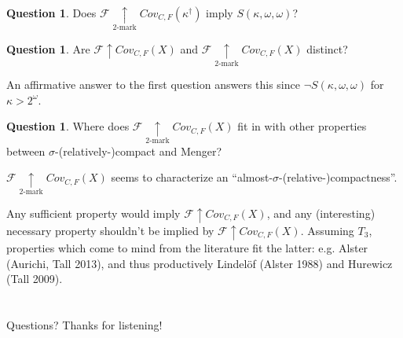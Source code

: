 \documentclass{beamer}
\theoremstyle{definition}
\newtheorem{question}[theorem]{Question}
\newcommand{\win}{\uparrow}
\newcommand{\kmarkwin}[1]{\underset{#1\text{-mark}}{\uparrow}}
\newcommand{\oneptlind}[1]{#1^\dagger}
\newcommand{\mengame}[1]{Cov_{C,F}(#1)}
\newcommand{\<}{\langle}
\renewcommand{\>}{\rangle}
\newcommand{\alcompS}[1]{S(#1,\omega,\omega)}
\newcommand{\pl}[1]{\mathscr{#1}}
\begin{document}
\begin{frame}
  \begin{question}
    Does $\pl F\kmarkwin2\mengame{\oneptlind\kappa}$ imply $\alcompS\kappa$?
  \end{question}

  \pause

  \begin{question}
    Are $\pl F\win\mengame X$ and $\pl F\kmarkwin2\mengame X$ distinct?
  \end{question}

  An affirmative answer to the first question answers this since
  $\neg\alcompS\kappa$ for $\kappa>2^\omega$.
\end{frame}
\begin{frame}
  \begin{question}
    Where does $\pl F\kmarkwin2\mengame X$ fit in with other properties
    between $\sigma$-(relatively-)compact and Menger?
  \end{question}
  $\pl F\kmarkwin2\mengame X$ seems to characterize an
  ``almost-$\sigma$-(relative-)compactness''.

  \vpause

  Any sufficient property would imply $\pl F\win\mengame X$, and any
  (interesting) necessary property shouldn't be implied by
  $\pl F\win\mengame X$. Assuming $T_3$, properties which come to mind
  from the literature fit the latter: e.g. Alster (Aurichi, Tall 2013),
  and thus productively Lindel\"of (Alster 1988) and Hurewicz (Tall 2009).
\end{frame}

\section*{}

\begin{frame}
Questions? Thanks for listening!
\end{frame}
\end{document}
